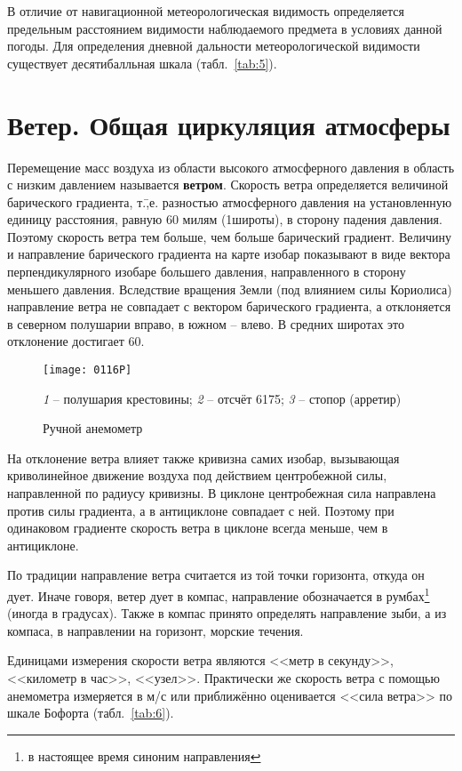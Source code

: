 В отличие от навигационной метеорологическая видимость определяется
предельным расстоянием видимости наблюдаемого предмета в условиях
данной погоды. Для определения дневной дальности метеорологической
видимости существует десятибалльная шкала (табл.~\ref{tab:5}).

\section{Ветер. Общая циркуляция атмосферы}

Перемещение масс воздуха из области высокого атмосферного давления в
область с низким давлением называется
\textbf{ветром}. Скорость ветра определяется величиной
барического градиента, т.\=,е. разностью атмосферного давления на
установленную единицу расстояния, равную 60 милям (1\gr широты), в
сторону падения давления. Поэтому скорость ветра тем больше, чем
больше барический градиент. Величину и направление барического
градиента на карте изобар показывают в виде вектора перпендикулярного
изобаре большего давления, направленного в сторону меньшего
давления. Вследствие вращения Земли (под влиянием силы Кориолиса)
направление ветра не совпадает с вектором барического градиента, а
отклоняется в северном полушарии вправо, в южном \--- влево. В средних
широтах это отклонение достигает 60\gr.

\begin{figure}[htb]
  \centering{}
  \texttt{[image: 0116P]}
  \caption{Ручной анемометр}
  \label{fig:116}
  \small
  \centering{}
  \textit{1} \--- полушария крестовины; \textit{2} \--- отсчёт 6175; \textit{3} \--- стопор (арретир)
\end{figure}

На отклонение ветра влияет также кривизна самих изобар, вызывающая
криволинейное движение воздуха под действием центробежной силы,
направленной по радиусу кривизны. В циклоне центробежная сила
направлена против силы градиента, а в антициклоне совпадает с
ней. Поэтому при одинаковом градиенте скорость ветра в циклоне всегда
меньше, чем в антициклоне.

По традиции направление ветра считается из той точки горизонта, откуда
он дует. Иначе говоря, ветер дует в компас, направление обозначается в
румбах\footnote{в настоящее время синоним направления} (иногда в
градусах). Также в компас принято определять направление зыби, а из
компаса, в направлении на горизонт, морские течения.

Единицами измерения скорости ветра являются <<метр в секунду>>,
<<километр в час>>, <<узел>>. Практически же скорость ветра с помощью
анемометра измеряется в м/с или приближённо оценивается <<сила ветра>>
по шкале Бофорта (табл.~\ref{tab:6}).

